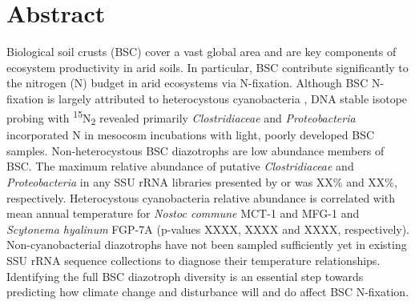 \section{Abstract}
Biological soil crusts (BSC) cover a vast global area and are key components of ecosystem productivity in arid soils. In particular, BSC contribute significantly to the nitrogen (N) budget in arid ecosystems via N-fixation. Although BSC N-fixation is largely attributed to heterocystous cyanobacteria \cite{Yeager, 14766579, Yeager_2012}, DNA stable isotope probing with \textsuperscript{15}N\textsubscript{2} revealed primarily \textit{Clostridiaceae} and \textit{Proteobacteria} incorporated N in mesocosm incubations with light, poorly developed BSC samples. Non-heterocystous BSC diazotrophs are low abundance members of BSC. The maximum relative abundance of putative \textit{Clostridiaceae} and \textit{Proteobacteria} in any SSU rRNA libraries presented by \citet{Garcia_Pichel_2013} or \citet{Steven_2013} was XX\% and XX\%, respectively. Heterocystous cyanobacteria relative abundance is correlated with mean annual temperature for \textit{Nostoc commune} MCT-1 and MFG-1 and \textit{Scytonema hyalinum} FGP-7A (p-values XXXX, XXXX and XXXX, respectively). Non-cyanobacterial diazotrophs have not been sampled sufficiently yet in existing SSU rRNA sequence collections to diagnose their temperature relationships. Identifying the full BSC diazotroph diversity is an essential step towards predicting how climate change and disturbance will and do affect BSC N-fixation.